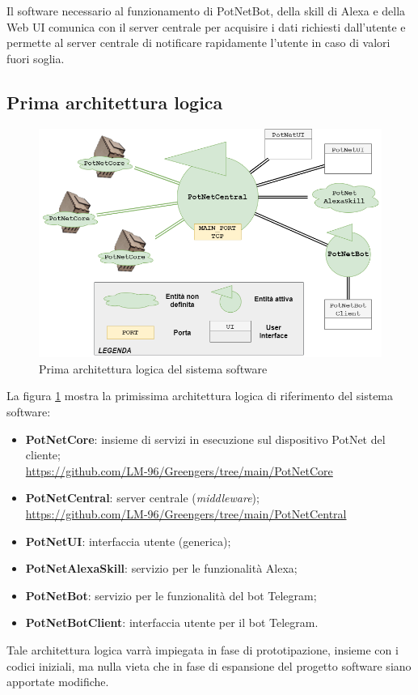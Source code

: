 Il software necessario al funzionamento di PotNetBot, della skill di Alexa e della Web UI comunica con il server centrale per acquisire i dati richiesti dall'utente e permette al server centrale di notificare rapidamente l'utente in caso di valori fuori soglia. 

\subsection{Prima architettura logica}
\begin{figure}[h]
	\centering
	\includegraphics[width=\textwidth]{images/logical_arch.png}
	\caption{Prima architettura logica del sistema software}
	\label{fig:logical_arch}
\end{figure}

La figura \ref{fig:logical_arch} mostra la primissima architettura logica di riferimento del sistema software:
\begin{itemize}
	\item \textbf{PotNetCore}: insieme di servizi in esecuzione sul dispositivo PotNet del cliente;\\
	\url{https://github.com/LM-96/Greengers/tree/main/PotNetCore}
	
	\item \textbf{PotNetCentral}: server centrale (\textit{middleware});\\
	\url{https://github.com/LM-96/Greengers/tree/main/PotNetCentral}
	\item \textbf{PotNetUI}: interfaccia utente (generica);
	
	\item \textbf{PotNetAlexaSkill}: servizio per le funzionalità Alexa;
	
	\item \textbf{PotNetBot}: servizio per le funzionalità del bot Telegram;
	
	\item \textbf{PotNetBotClient}: interfaccia utente per il bot Telegram.
\end{itemize}
Tale architettura logica varrà impiegata in fase di prototipazione, insieme con i codici iniziali, ma nulla vieta che in fase di espansione del progetto software siano apportate modifiche.

